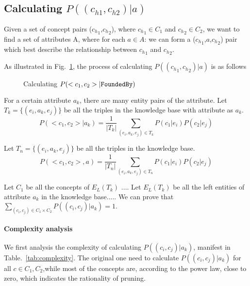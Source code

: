 \subsection{Calculating $P((c_{h1},c_{h2})|a)$ }


Given a set of concept pairs (${c_h}_1$,${c_h}_2$), where ${c_h}_1\in C_1$ and ${c_h}_2\in C_2$, we want to find a set of attributes A, where for each $a \in A$:
we can form a (${c_h}_1$,$a$,${c_h}_2$) pair which best describe the relationship between ${c_h}_1$ and ${c_h}_2$.

\begin{example}[Calculating $P(({c_h}_{1},{c_h}_{2}) |a)$]
\label{exa:pggga}
As illustrated in Fig.~\ref{fig:bipartite}, the process of calculating $P(({c_h}_{1},{c_h}_{2}) |a)$ is as follows\term{}
\end{example}


\begin{figure}[!htb]
\centering {}
\caption{Calculating $P( <{c}_{1},{c}_{2}> | {\tt FoundedBy} )$ } \label{fig:bipartite}
\end{figure}


For a certain attribute $a_k$, there are many entity pairs of the attribute.
Let $T_k=\{(e_i, a_k, e_j)\}$ be all the triples in the knowledge base with attribute as $a_k$.
\begin{equation}
P(<c_1, c_2>|a_k) = \frac{1}{|T_k|}\sum_{  (e_{i},a_k,e_{j})\in T_k } P(c_1|e_{i})P(c_2|e_{j})
\label{eq:pccga}
\end{equation}


Let $T_n=\{(e_i, a_k, e_j)\}$ be all the triples in the knowledge base.
\begin{equation}
P(<c_1, c_2>,a) = \frac{1}{|T_n|}\sum_{  (e_{i},a_k,e_{j})\in T_n } P(c_1|e_{i})P(c_2|e_{j})
\label{eq:pcca}
\end{equation}


Let $C_1$ be all the concepts of $E_L(T_k)$ .... Let $E_L(T_k)$ be all the left entities of attribute $a_k$ in the knowledge base..... We can prove that $\sum_{(c_i,c_j)\in C_1\times C_2} P((c_i, c_j)|a_k)=1$.

\paragraph{Complexity analysis}

We first analysis the complexity of calculating $P((c_i, c_j)|a_k)$, manifest in Table.~\ref{tab:complexity}. The original one need to calculate $P((c_i, c_j)|a_k)$ for all $c \in C_1,C_2 $,while most of the concepts are, according to the power law, close to zero, which indicates the rationality of pruning.

